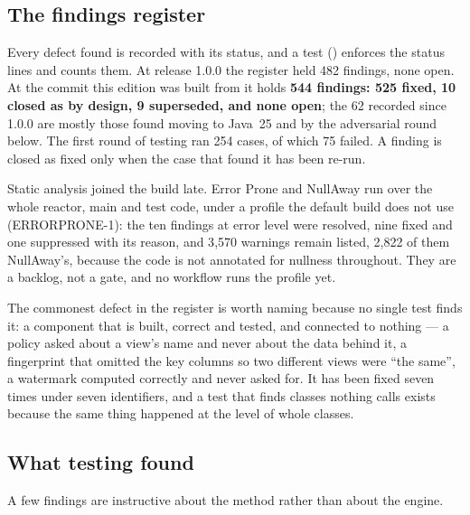 \documentclass[11pt,a4paper]{article}
\renewcommand{\_}{\oldunderscore\allowbreak}
\newcommand{\cls}[1]{\texttt{\pvbreakable{#1}}}
\begin{document}
\subsection{The findings register}

Every defect found is recorded with its status, and a test (\cls{FindingsRegisterTest}) enforces the
status lines and counts them. At release 1.0.0 the register held 482 findings, none open. At the commit
this edition was built from it holds \textbf{544 findings: 525 fixed, 10 closed as by design, 9
superseded, and none open}; the 62 recorded since 1.0.0 are mostly those found moving to Java~25 and
by the adversarial round below. The first round of testing ran 254 cases, of which
75 failed. A finding is closed as fixed only when the case that found it has been re-run.

Static analysis joined the build late. Error Prone and NullAway run over the whole reactor, main and test
code, under a profile the default build does not use (ERRORPRONE-1): the ten findings at error level were
resolved, nine fixed and one suppressed with its reason, and 3{,}570 warnings remain listed, 2{,}822 of
them NullAway's, because the code is not annotated for nullness throughout. They are a backlog, not a gate,
and no workflow runs the profile yet.

The commonest defect in the register is worth naming because no single test finds it: a component that
is built, correct and tested, and connected to nothing --- a policy asked about a view's name and never
about the data behind it, a fingerprint that omitted the key columns so two different views were ``the
same'', a watermark computed correctly and never asked for. It has been fixed seven times under seven
identifiers, and a test that finds classes nothing calls exists because the same thing happened at the
level of whole classes.

\subsection{What testing found}

A few findings are instructive about the method rather than about the engine.
\end{document}
